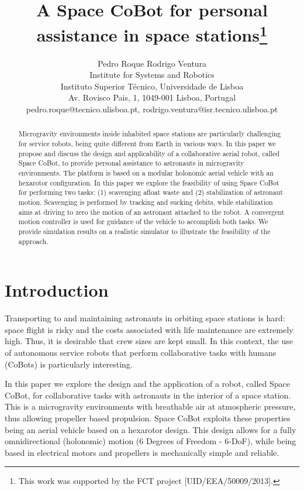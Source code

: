 \documentclass{article}
\title{A Space CoBot for personal assistance in space stations\thanks{This work was
supported by the FCT project [UID/EEA/50009/2013].}}
\author{Pedro Roque \qquad Rodrigo Ventura \\
  Institute for Systems and Robotics \\
  Instituto Superior Técnico, Universidade de Lisboa \\
  Av. Rovisco Pais, 1, 1049-001 Lisboa, Portugal \\
  pedro.roque@tecnico.ulisboa.pt, rodrigo.ventura@isr.tecnico.ulisboa.pt}
\begin{document}
\maketitle

\begin{abstract}
  Microgravity environments inside inhabited space stations are
  particularly challenging for service robots, being quite different
  from Earth in various ways. In this paper we propose
  and discuss the design and applicability of a collaborative aerial
  robot, called Space CoBot, to provide personal assistance to
  astronauts in microgravity environments. The platform is based on a
  modular holonomic aerial vehicle with an hexarotor configuration. In
  this paper we explore the feasibility of using Space CoBot for
  performing two tasks: (1) scavenging afloat waste and
  (2) stabilization of astronaut motion.  Scavenging is performed by
  tracking and sucking debits, while stabilization aims at
  driving to zero the motion of an astronaut attached to the robot. A
  convergent motion controller is used for guidance of the vehicle to
  accomplish both tasks. We provide simulation results on a realistic
  simulator to illustrate the feasibility of the approach.
\end{abstract}


\section{Introduction}
\label{sec:introduction}

Transporting to and maintaining astronauts in orbiting space stations is
hard: space flight is risky and the costs associated with life
maintenance are extremely high. Thus, it is desirable that crew sizes
are kept small. In this context, the use of
autonomous service robots that perform collaborative tasks with humans
(CoBots) is particularly interesting.

In this paper we explore the design and the application of a robot, called
Space CoBot, for collaborative tasks with astronauts in the interior
of a space station. 
This is a microgravity environments with
breathable air at atmospheric pressure, thus allowing propeller based
propulsion. Space CoBot exploits these properties being an aerial
vehicle based on a hexarotor design. This design allows for a fully
omnidirectional (holonomic) motion (6 Degrees of Freedom - 6-DoF),
while being based in electrical motors and propellers is mechanically
simple and reliable.
\end{document}
